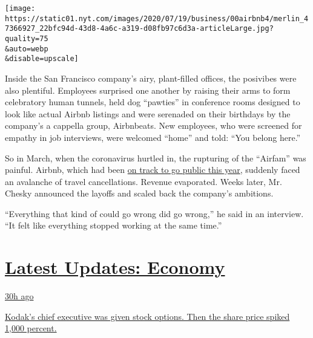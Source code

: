 \texttt{[image: https://static01.nyt.com/images/2020/07/19/business/00airbnb4/merlin\_47366927\_22bfc94d-43d8-4a6c-a319-d08fb97c6d3a-articleLarge.jpg?quality=75\\\&auto=webp\\\&disable=upscale]}

Inside the San Francisco company's airy, plant-filled offices, the
posivibes were also plentiful. Employees surprised one another by
raising their arms to form celebratory human tunnels, held dog
``pawties'' in conference rooms designed to look like actual Airbnb
listings and were serenaded on their birthdays by the company's a
cappella group, Airbnbeats. New employees, who were screened for empathy
in job interviews, were welcomed ``home'' and told: ``You belong here.''

So in March, when the coronavirus hurtled in, the rupturing of the
``Airfam'' was painful. Airbnb, which had been
\href{https://www.nytimes.com/2019/09/19/technology/airbnb-ipo-2020.html}{on
track to go public this year}, suddenly faced an avalanche of travel
cancellations. Revenue evaporated. Weeks later, Mr. Chesky announced the
layoffs and scaled back the company's ambitions.

``Everything that kind of could go wrong did go wrong,'' he said in an
interview. ``It felt like everything stopped working at the same time.''

\hypertarget{latest-updates-economy}{%
\section{\texorpdfstring{\href{https://www.nytimes.com/live/2020/07/31/business/stock-market-today-coronavirus?action=click\&pgtype=Article\&state=default\&region=MAIN_CONTENT_1\&context=storylines_live_updates}{Latest
Updates:
Economy}}{Latest Updates: Economy}}\label{latest-updates-economy}}

\href{https://www.nytimes.com/live/2020/07/31/business/stock-market-today-coronavirus?action=click\&pgtype=Article\&state=default\&region=MAIN_CONTENT_1\&context=storylines_live_updates\#kodaks-chief-executive-was-given-stock-options-then-the-share-price-spiked-1000-percent}{30h
ago}

\href{https://www.nytimes.com/live/2020/07/31/business/stock-market-today-coronavirus?action=click\&pgtype=Article\&state=default\&region=MAIN_CONTENT_1\&context=storylines_live_updates\#kodaks-chief-executive-was-given-stock-options-then-the-share-price-spiked-1000-percent}{Kodak's
chief executive was given stock options. Then the share price spiked
1,000 percent.}

